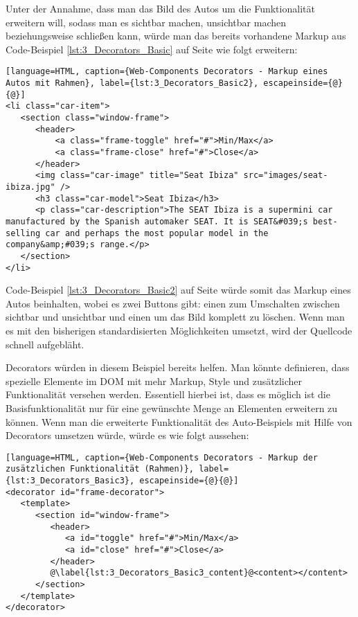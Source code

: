 Unter der Annahme, dass man das Bild des Autos um die Funktionalität erweitern will, sodass man es sichtbar machen, unsichtbar machen beziehungsweise schließen kann, würde man das bereits vorhandene Markup aus Code-Beispiel \ref{lst:3_Decorators_Basic} auf Seite \pageref{lst:3_Decorators_Basic} wie folgt erweitern:

\begin{lstlisting}[language=HTML, caption={Web-Components Decorators - Markup eines Autos mit Rahmen}, label={lst:3_Decorators_Basic2}, escapeinside={@}{@}]
<li class="car-item">
   <section class="window-frame">
      <header>
          <a class="frame-toggle" href="#">Min/Max</a>
          <a class="frame-close" href="#">Close</a>
      </header>
      <img class="car-image" title="Seat Ibiza" src="images/seat-ibiza.jpg" />
      <h3 class="car-model">Seat Ibiza</h3>
      <p class="car-description">The SEAT Ibiza is a supermini car manufactured by the Spanish automaker SEAT. It is SEAT&#039;s best-selling car and perhaps the most popular model in the company&amp;#039;s range.</p>
   </section>
</li>
\end{lstlisting}

Code-Beispiel \ref{lst:3_Decorators_Basic2} auf Seite \pageref{lst:3_Decorators_Basic2} würde somit das Markup eines Autos beinhalten, wobei es zwei Buttons gibt: einen zum Umschalten zwischen sichtbar und unsichtbar und einen um das Bild komplett zu löschen.
Wenn man es mit den bisherigen standardisierten Möglichkeiten umsetzt, wird der Quellcode schnell aufgebläht.

Decorators würden in diesem Beispiel bereits helfen. Man könnte definieren, dass spezielle Elemente im DOM mit mehr Markup, Style und zusätzlicher Funktionalität versehen werden. Essentiell hierbei ist, dass es möglich ist die Basisfunktionalität nur für eine gewünschte Menge an Elementen erweitern zu können. Wenn man die erweiterte Funktionalität des Auto-Beispiels mit Hilfe von Decorators umsetzen würde, würde es wie folgt aussehen:

\begin{lstlisting}[language=HTML, caption={Web-Components Decorators - Markup der zusätzlichen Funktionalität (Rahmen)}, label={lst:3_Decorators_Basic3}, escapeinside={@}{@}]
<decorator id="frame-decorator">
   <template>
      <section id="window-frame">
         <header>
            <a id="toggle" href="#">Min/Max</a>
            <a id="close" href="#">Close</a>
         </header>
         @\label{lst:3_Decorators_Basic3_content}@<content></content>
      </section>
   </template>
</decorator>
\end{lstlisting}


